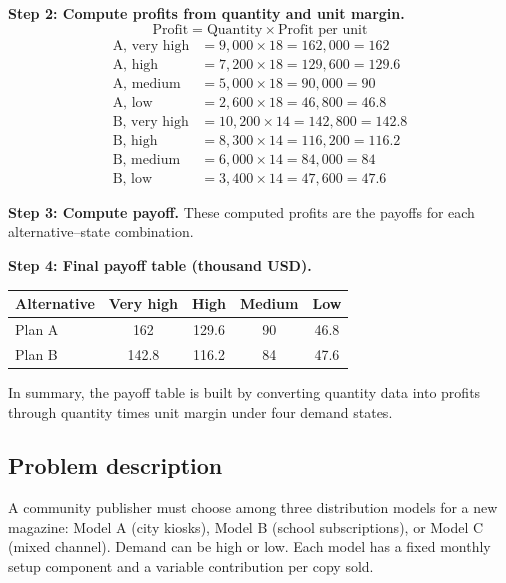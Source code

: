 \begin{ExamProblems}
		\textbf{Step 2: Compute profits from quantity and unit margin.}
		\[
		\text{Profit} = \text{Quantity} \times \text{Profit per unit}
		\]
		\[
		\begin{aligned}
		\text{A, very high} &= 9{,}000 \times 18 = 162{,}000 = 162 \\
		\text{A, high} &= 7{,}200 \times 18 = 129{,}600 = 129.6 \\
		\text{A, medium} &= 5{,}000 \times 18 = 90{,}000 = 90 \\
		\text{A, low} &= 2{,}600 \times 18 = 46{,}800 = 46.8 \\
		\text{B, very high} &= 10{,}200 \times 14 = 142{,}800 = 142.8 \\
		\text{B, high} &= 8{,}300 \times 14 = 116{,}200 = 116.2 \\
		\text{B, medium} &= 6{,}000 \times 14 = 84{,}000 = 84 \\
		\text{B, low} &= 3{,}400 \times 14 = 47{,}600 = 47.6
		\end{aligned}
		\]
		
		\textbf{Step 3: Compute payoff.} These computed profits are the payoffs for each alternative--state combination.
		
		\textbf{Step 4: Final payoff table (thousand USD).}
		\begin{center}
			\begin{tabular}{l c c c c}
				\toprule
				Alternative & Very high & High & Medium & Low \\
				\midrule
				Plan A & 162 & 129.6 & 90 & 46.8 \\
				Plan B & 142.8 & 116.2 & 84 & 47.6 \\
				\bottomrule
			\end{tabular}
		\end{center}
		
		In summary, the payoff table is built by converting quantity data into profits through quantity times unit margin under four demand states.
		
		\item
		\subsection*{Problem description}
		A community publisher must choose among three distribution models for a new magazine: Model A (city kiosks),
		Model B (school subscriptions), or Model C (mixed channel). Demand can be high or low.
		Each model has a fixed monthly setup component and a variable contribution per copy sold.
		

\end{ExamProblems}
